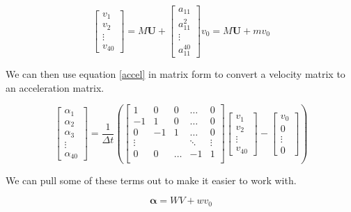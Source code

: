 \documentclass[a4paper,12pt]{article}
\begin{document}
\begin{equation}
  \begin{bmatrix} v_1 \\ v_2 \\ \vdots \\ v_{40} \end{bmatrix} =
     M \boldsymbol{U} + \begin{bmatrix} a_{11} \\ a^2_{11} \\ \vdots \\ a^{40}_{11} \end{bmatrix} v_0 =
     M \boldsymbol{U} + m v_0
\end{equation}

We can then use equation \ref{accel} in matrix form to convert a velocity matrix to an acceleration matrix.

\begin{equation}
  \begin{bmatrix} \alpha_1 \\ \alpha_2 \\ \alpha_3 \\ \vdots \\ \alpha_{40} \end{bmatrix} =
    \frac{1}{\Delta t} \left(
    \begin{bmatrix} 1 & 0 & 0 & \hdots & 0 \\
                    -1 & 1 & 0 & \hdots & 0 \\
                    0 & -1 & 1 & \hdots & 0 \\
                    \vdots & & & \ddots  & \vdots \\
                    0 & 0 & \hdots & -1 & 1 \\
  \end{bmatrix}
  \begin{bmatrix} v_1 \\ v_2 \\ \vdots \\ v_{40} \end{bmatrix} - \begin{bmatrix} v_0 \\ 0 \\ \vdots \\ 0 \end{bmatrix}
\right)
\end{equation}

We can pull some of these terms out to make it easier to work with.

\begin{equation}
\boldsymbol{\alpha} = W V + w v_0
\end{equation}
\end{document}
